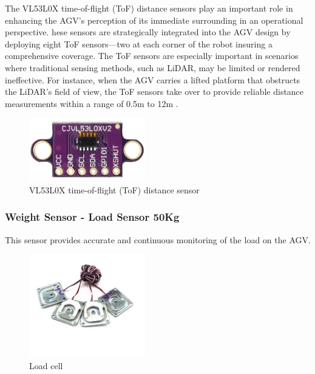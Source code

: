 \documentclass[../../main]{subfiles}
\begin{document}
The VL53L0X time-of-flight (ToF) distance sensors  play an important role in enhancing 
the AGV's perception of its immediate surrounding in an operational perspective. 
hese sensors are strategically integrated into the AGV design by deploying eight 
ToF sensors—two at each corner of the robot insuring a comprehensive coverage. 
The ToF sensors are especially important in scenarios where traditional sensing methods, 
such as LiDAR, may be limited or rendered ineffective. For instance, when the AGV carries 
a lifted platform that obstructs the LiDAR's field of view, the ToF sensors take over to provide reliable distance measurements within a range of 0.5m to 12m . 
\begin{figure}[H]
    \centering
    \includegraphics[width=0.45\textwidth]{fig/tof_sensor.png}
    \caption{ VL53L0X time-of-flight (ToF) distance sensor }
    \label{LVL53L0X ToF sensor } %
\end{figure}


\subsubsection{Weight Sensor - Load Sensor 50Kg}

This sensor provides accurate and continuous monitoring of the load on the AGV.

\begin{figure}[H]
    \centering
    \includegraphics[width=0.45\textwidth]{fig/4_cells.png}
    \caption{ Load cell }
    \label{Load cell} %
\end{figure}
\end{document}
